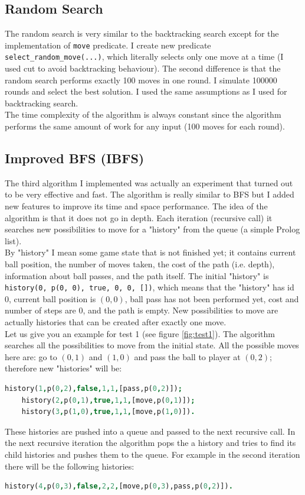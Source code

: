 \documentclass{article}
\begin{document}
\subsection{Random Search}
The random search is very similar to the backtracking search except for the implementation of \texttt{move} predicate. I create new predicate \texttt{select\_random\_move(...)}, which literally selects only one move at a time (I used cut to avoid backtracking behaviour). The second difference is that the random search performs exactly 100 moves in one round. I simulate 100000 rounds and select the best solution. I used the same assumptions as I used for backtracking search.\\
The time complexity of the algorithm is always constant since the algorithm performs the same amount of work for any input (100 moves for each round). 

\subsection{Improved BFS (IBFS)}
The third algorithm I implemented was actually an experiment that turned out to be very effective and fast. The algorithm is really similar to BFS but I added new features to improve its time and space performance. The idea of the algorithm is that it does not go in depth. Each iteration (recursive call) it searches new possibilities to move for a "history" from the queue (a simple Prolog list). 
\\By "history" I mean some game state that is not finished yet; it contains current ball position, the number of moves taken, the cost of the path (i.e. depth), information about ball passes, and the path itself. The initial "history" is \texttt{history(0, p(0, 0), true, 0, 0, [])}, which means that the "history" has id 0, current ball position is $(0, 0)$, ball pass has not been performed yet, cost and number of steps are 0, and the path is empty. New possibilities to move are actually histories that can be created after exactly one move. 
\\Let us give you an example for test 1 (see figure \ref{fig:test1}). The algorithm searches all the possibilities to move from the initial state. All the possible moves here are: go to $(0, 1)$ and $(1, 0)$ and pass the ball to player at $(0, 2)$; therefore new "histories" will be:
\begin{lstlisting}[caption=Histories of depth 1={lst:listing2}, language=Prolog]
	history(1,p(0,2),false,1,1,[pass,p(0,2)]);
	history(2,p(0,1),true,1,1,[move,p(0,1)]);
	history(3,p(1,0),true,1,1,[move,p(1,0)]).
\end{lstlisting}
These histories are pushed into a queue and passed to the next recursive call. In the next recursive iteration the algorithm pops the a history and tries to find its child histories and pushes them to the queue. For example in the second iteration there will be the following histories:
\begin{lstlisting}[caption=History of depth 2={lst:listing2}, language=Prolog]
	history(4,p(0,3),false,2,2,[move,p(0,3),pass,p(0,2)]).
\end{lstlisting}
\end{document}
